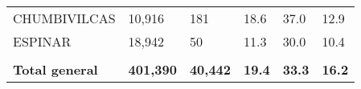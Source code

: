 \begin{tabular}{llllll}
	\cellcolor[HTML]{F8CBAD}CHUMBIVILCAS                           & 10,916                                                                & 181                                                              & 18.6                                                                             & 37.0                                                                        & 12.9                                                                                \\
	\cellcolor[HTML]{F8CBAD}ESPINAR                                & 18,942                                                                & 50                                                               & 11.3                                                                             & 30.0                                                                        & 10.4                                                                                \\
	&                                                                       &                                                                  &                                                                                  &                                                                             &                                                                                     \\
	\rowcolor[HTML]{DDEBF7} 
	\textbf{Total   general}                                       & \textbf{401,390}                                                      & \textbf{40,442}                                                  & \textbf{19.4}                                                                    & \textbf{33.3}                                                               & \textbf{16.2}                                                                      
\end{tabular}